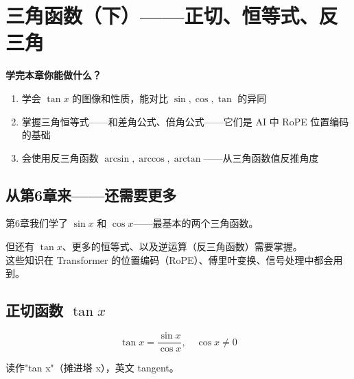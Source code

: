 
\chapter{三角函数（下）——正切、恒等式、反三角}

\begin{applicationbox}
\textbf{学完本章你能做什么？}
\begin{enumerate}
  \item 学会 \(\tan x\) 的图像和性质，能对比 \(\sin, \cos, \tan\) 的异同
  \item 掌握三角恒等式——和差角公式、倍角公式——它们是 AI 中 RoPE 位置编码的基础
  \item 会使用反三角函数 \(\arcsin, \arccos, \arctan\)——从三角函数值反推角度
\end{enumerate}
\end{applicationbox}


\section{从第6章来——还需要更多}

第6章我们学了 \(\sin x\) 和 \(\cos x\)——最基本的两个三角函数。

但还有 \(\tan x\)、更多的恒等式、以及逆运算（反三角函数）需要掌握。\\
这些知识在 Transformer 的位置编码（RoPE）、傅里叶变换、信号处理中都会用到。


\section{正切函数 \(\tan x\)}

\begin{definitionbox}[正切函数]
\[
\tan x = \frac{\sin x}{\cos x}, \quad \cos x \neq 0
\]

读作"tan x"（摊进塔 x），英文 tangent。
\end{definitionbox}

